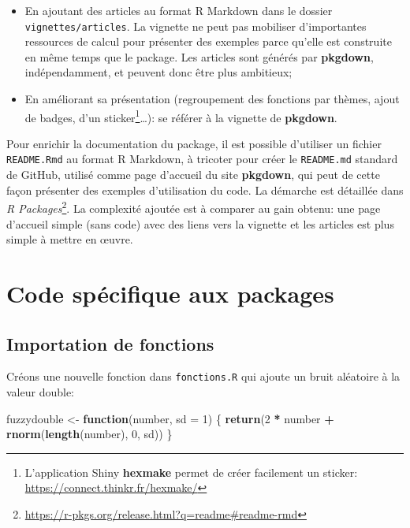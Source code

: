 \documentclass[
  12pt,
  french,
  a4paper,
  extrafontsizes,onecolumn,openright
  ]{memoir}
\newenvironment{Shaded}{\begin{snugshade}}{\end{snugshade}}
\newcommand{\AttributeTok}[1]{\textcolor[rgb]{0.13,0.29,0.53}{#1}}
\newcommand{\ControlFlowTok}[1]{\textcolor[rgb]{0.13,0.29,0.53}{\textbf{#1}}}
\newcommand{\DecValTok}[1]{\textcolor[rgb]{0.00,0.00,0.81}{#1}}
\newcommand{\FunctionTok}[1]{\textcolor[rgb]{0.13,0.29,0.53}{\textbf{#1}}}
\newcommand{\NormalTok}[1]{#1}
\newcommand{\OtherTok}[1]{\textcolor[rgb]{0.56,0.35,0.01}{#1}}
\newcommand{\SpecialCharTok}[1]{\textcolor[rgb]{0.81,0.36,0.00}{\textbf{#1}}}
\providecommand{\tightlist}{%
  \setlength{\itemsep}{0pt}\setlength{\parskip}{0pt}}
\begin{document}
\begin{itemize}
\tightlist
\item
  En ajoutant des articles au format R Markdown dans le dossier \texttt{vignettes/articles}.
  La vignette ne peut pas mobiliser d'importantes ressources de calcul pour présenter des exemples parce qu'elle est construite en même temps que le package.
  Les articles sont générés par \textbf{pkgdown}, indépendamment, et peuvent donc être plus ambitieux;
\item
  En améliorant sa présentation (regroupement des fonctions par thèmes, ajout de badges, d'un sticker\footnote{L'application Shiny \textbf{hexmake} permet de créer facilement un sticker: \url{https://connect.thinkr.fr/hexmake/}}\ldots): se référer à la vignette de \textbf{pkgdown}.
\end{itemize}

Pour enrichir la documentation du package, il est possible d'utiliser un fichier \texttt{README.Rmd} au format R Markdown, à tricoter pour créer le \texttt{README.md} standard de GitHub, utilisé comme page d'accueil du site \textbf{pkgdown}, qui peut de cette façon présenter des exemples d'utilisation du code.
La démarche est détaillée dans \emph{R Packages}\footnote{\url{https://r-pkgs.org/release.html?q=readme\#readme-rmd}}.
La complexité ajoutée est à comparer au gain obtenu: une page d'accueil simple (sans code) avec des liens vers la vignette et les articles est plus simple à mettre en œuvre.

\section{Code spécifique aux packages}\label{code-spuxe9cifique-aux-packages}

\subsection{Importation de fonctions}\label{importation-de-fonctions}

Créons une nouvelle fonction dans \texttt{fonctions.R} qui ajoute un bruit aléatoire à la valeur double:

\scriptsize

\begin{Shaded}
\begin{Highlighting}[]
\NormalTok{fuzzydouble }\OtherTok{\textless{}{-}} \ControlFlowTok{function}\NormalTok{(number, }\AttributeTok{sd =} \DecValTok{1}\NormalTok{) \{}
  \FunctionTok{return}\NormalTok{(}\DecValTok{2} \SpecialCharTok{*}\NormalTok{ number }\SpecialCharTok{+} \FunctionTok{rnorm}\NormalTok{(}\FunctionTok{length}\NormalTok{(number), }\DecValTok{0}\NormalTok{, sd))}
\NormalTok{\}}
\end{Highlighting}
\end{Shaded}
\end{document}
